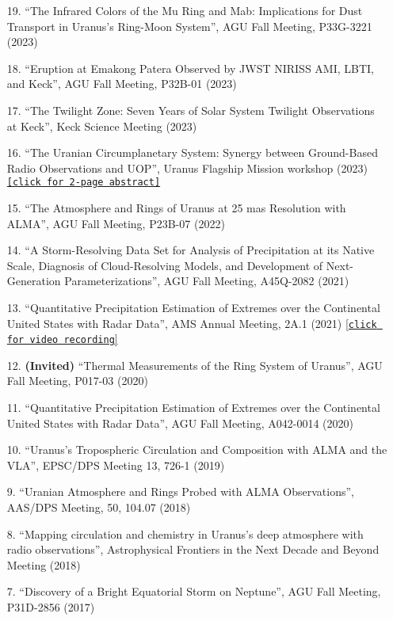 \documentclass[margin, 10pt]{res} %
\begin{document}
\begin{resume}
\begin{enumerate}
\item[19.] ``The Infrared Colors of the Mu Ring and Mab: Implications for Dust Transport in Uranus's Ring-Moon System'', AGU Fall Meeting, P33G-3221 (2023)
\item[18.] ``Eruption at Emakong Patera Observed by JWST NIRISS AMI, LBTI, and Keck'', AGU Fall Meeting, P32B-01 (2023)
\item[17.] ``The Twilight Zone: Seven Years of Solar System Twilight Observations at Keck'', Keck Science Meeting (2023)
\item[16.] ``The Uranian Circumplanetary System: Synergy between Ground-Based Radio Observations and UOP'', Uranus Flagship Mission workshop (2023) \href{https://www.hou.usra.edu/meetings/uranusflagship2023/pdf/8157.pdf}{\texttt{[click for 2-page abstract]}}
\item[15.] ``The Atmosphere and Rings of Uranus at 25 mas Resolution with ALMA'', AGU Fall Meeting, P23B-07 (2022)
\item[14.] ``A Storm-Resolving Data Set for Analysis of Precipitation at its Native Scale, Diagnosis of Cloud-Resolving Models, and Development of Next-Generation Parameterizations'', AGU Fall Meeting, A45Q-2082 (2021)
\item[13.] ``Quantitative Precipitation Estimation of Extremes over the Continental United States with Radar Data'', AMS Annual Meeting, 2A.1 (2021) \href{https://ams.confex.com/ams/101ANNUAL/meetingapp.cgi/Paper/381114}{[\texttt{click for video recording}]}
\item[12.] \textbf{(Invited)} ``Thermal Measurements of the Ring System of Uranus'', AGU Fall Meeting, P017-03 (2020)
\item[11.] ``Quantitative Precipitation Estimation of Extremes over the Continental United States with Radar Data'', AGU Fall Meeting, A042-0014 (2020)
\item[10.] ``Uranus's Tropospheric Circulation and Composition with ALMA and the VLA'', EPSC/DPS Meeting 13, 726-1 (2019)
\item[9.] ``Uranian Atmosphere and Rings Probed with ALMA Observations'', AAS/DPS Meeting, 50, 104.07 (2018)
\item[8.] ``Mapping circulation and chemistry in Uranus's deep atmosphere with radio observations'', Astrophysical Frontiers in the Next Decade and Beyond Meeting (2018)
\item[7.] ``Discovery of a Bright Equatorial Storm on Neptune'', AGU Fall Meeting, P31D-2856 (2017)

\end{enumerate}
\end{resume}
\end{document}
